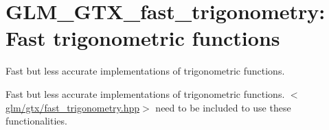 \hypertarget{group__gtx__fast__trigonometry}{\section{\-G\-L\-M\-\_\-\-G\-T\-X\-\_\-fast\-\_\-trigonometry\-: \-Fast trigonometric functions}
\label{group__gtx__fast__trigonometry}
}


\-Fast but less accurate implementations of trigonometric functions.  


\-Fast but less accurate implementations of trigonometric functions. $<$\hyperlink{fast__trigonometry_8hpp}{glm/gtx/fast\-\_\-trigonometry.\-hpp}$>$ need to be included to use these functionalities. 